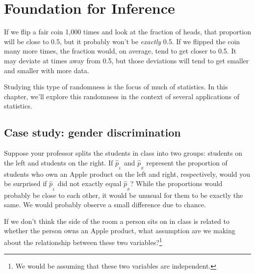 \chapter{Foundation for Inference}
\label{FoundationForInference}


If we flip a fair coin 1,000 times and look at the fraction of heads, that proportion will be close to 0.5, but it probably won't be \emph{exactly} 0.5. If we flipped the coin many more times, the fraction would, on average, tend to get closer to 0.5. It may deviate at times away from 0.5, but those deviations will tend to get smaller and smaller with more data.

Studying this type of randomness is the focus of much of statistics. In this chapter, we'll explore this randomness in the context of several applications of statistics.

\section{Case study: gender discrimination}
\label{caseStudyGenderDiscrimination}


\begin{example}{Suppose your professor splits the students in class into two groups: students on the left and students on the right. If $\hat{p}_{_L}$ and $\hat{p}_{_R}$ represent the proportion of students who own an Apple product on the left and right, respectively, would you be surprised if $\hat{p}_{_L}$ did not {exactly} equal $\hat{p}_{_R}$?}\label{classRightLeftSideApple}
While the proportions would probably be close to each other, it would be unusual for them to be exactly the same. We would probably observe a small difference due to {chance}.
\end{example}

\begin{exercise}
If we don't think the side of the room a person sits on in class is related to whether the person owns an Apple product, what assumption are we making about the relationship between these two variables?\footnote{We would be assuming that these two variables are independent.}
\end{exercise}

